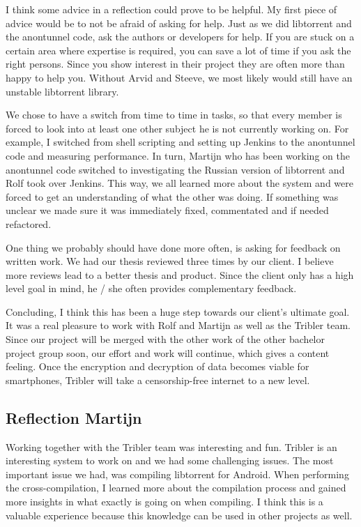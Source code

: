 			I think some advice in a reflection could prove to be helpful. My first piece of advice would be to not be afraid of asking for help.
			Just as we did libtorrent and the anontunnel code, ask the authors or developers for help. If you are stuck on a certain area where expertise is required, you can save a lot of time if you ask the right persons.
			Since you show interest in their project they are often more than happy to help you. Without Arvid and Steeve, we most likely would still have an unstable libtorrent library.
			
			
			We chose to have a switch from time to time in tasks, so that every member is forced to look into at least one other subject he is not currently working on. For example, I switched from shell scripting and setting up Jenkins to the anontunnel code and measuring performance. In turn, Martijn who has been working on the anontunnel code switched to investigating the Russian version of libtorrent and Rolf took over Jenkins. This way, we all learned more about the system and were forced to get an understanding of what the other was doing. If something was unclear we made sure it was immediately fixed, commentated and if needed refactored.
			
			
			One thing we probably should have done more often, is asking for feedback on written work. We had our thesis reviewed three times by our client. I believe more reviews lead to a better thesis and product. Since the client only has a high level goal in mind, he / she often provides complementary feedback.
			
			
			Concluding, I think this has been a huge step towards our client's ultimate goal. It was a real pleasure to work with Rolf and Martijn as well as the Tribler team. Since our project will be merged with the other work of the other bachelor project group soon, our effort and work will continue, which gives a content feeling. Once the encryption and decryption of data becomes viable for smartphones, Tribler will take a censorship-free internet to a new level.
		
		\subsection{Reflection Martijn}
			Working together with the Tribler team was interesting and fun. Tribler is an interesting system to work on and we had some challenging issues. The most important issue we had, was compiling libtorrent for Android. When performing the cross-compilation, I learned more about the compilation process and gained more insights in what exactly is going on when compiling. I think this is a valuable experience because this knowledge can be used in other projects as well.
		
